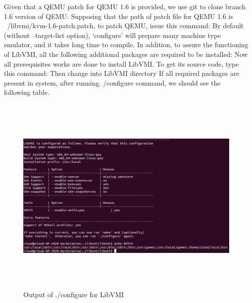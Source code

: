 Given that a QEMU patch for QEMU 1.6 is provided, we use git to clone branch 1.6 version of QEMU:
Supposing that the path of patch file for QEMU 1.6 is ~/libvmi/kvm-1.6-patch.patch, to patch QEMU, issue this command:
By default (without –target-list option), ‘configure’ will prepare many machine type emulator, and it takes long time to compile.
In addition, to assure the functioning of LibVMI, all the following additional packages are required to be installed:
Now all prerequisites works are done to install LibVMI. To get its source code, type this command:
Then change into LibVMI directory
If all required packages are present in system, after running. /configure command, we should see the following table.
\begin{figure}[htbp]
	\centering
		\includegraphics[width=14cm, height= 10cm ]{Figures/Figure21.png}
	\caption[Output of ./configure for LibVMI]{Output of ./configure for LibVMI}
	\label{fig:Output of ./configure for LibVMI}
\end{figure}

